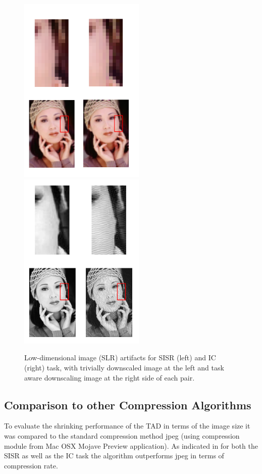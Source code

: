 \begin{figure}[!htbp]
	\centering
	\includegraphics[width=6cm]{figures/sisr_slr_artifacts}
	\includegraphics[width=6cm]{figures/ic_slr_artifacts}
	\caption{Low-dimensional image (SLR) artifacts for \ac{SISR} (left) and \ac{IC} (right) task, with trivially downscaled image at the left and task aware downscaling image at the right side of each pair.}
  \label{fig:slr_artifacts}
\end{figure}

\subsection*{Comparison to other Compression Algorithms}
To evaluate the shrinking performance of the \ac{TAD} in terms of the image size it was compared to the standard compression method jpeg \cite{jpeg} (using compression module from Mac OSX Mojave Preview application). As indicated in  for both the \ac{SISR} as well as the \ac{IC} task the algorithm outperforms jpeg in terms of compression rate. 

